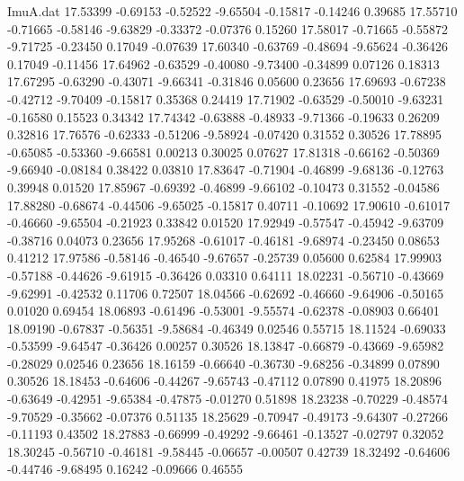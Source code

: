 \begin{filecontents}{ImuA.dat}
  17.53399   -0.69153   -0.52522   -9.65504   -0.15817   -0.14246    0.39685
  17.55710   -0.71665   -0.58146   -9.63829   -0.33372   -0.07376    0.15260
  17.58017   -0.71665   -0.55872   -9.71725   -0.23450    0.17049   -0.07639
  17.60340   -0.63769   -0.48694   -9.65624   -0.36426    0.17049   -0.11456
  17.64962   -0.63529   -0.40080   -9.73400   -0.34899    0.07126    0.18313
  17.67295   -0.63290   -0.43071   -9.66341   -0.31846    0.05600    0.23656
  17.69693   -0.67238   -0.42712   -9.70409   -0.15817    0.35368    0.24419
  17.71902   -0.63529   -0.50010   -9.63231   -0.16580    0.15523    0.34342
  17.74342   -0.63888   -0.48933   -9.71366   -0.19633    0.26209    0.32816
  17.76576   -0.62333   -0.51206   -9.58924   -0.07420    0.31552    0.30526
  17.78895   -0.65085   -0.53360   -9.66581    0.00213    0.30025    0.07627
  17.81318   -0.66162   -0.50369   -9.66940   -0.08184    0.38422    0.03810
  17.83647   -0.71904   -0.46899   -9.68136   -0.12763    0.39948    0.01520
  17.85967   -0.69392   -0.46899   -9.66102   -0.10473    0.31552   -0.04586
  17.88280   -0.68674   -0.44506   -9.65025   -0.15817    0.40711   -0.10692
  17.90610   -0.61017   -0.46660   -9.65504   -0.21923    0.33842    0.01520
  17.92949   -0.57547   -0.45942   -9.63709   -0.38716    0.04073    0.23656
  17.95268   -0.61017   -0.46181   -9.68974   -0.23450    0.08653    0.41212
  17.97586   -0.58146   -0.46540   -9.67657   -0.25739    0.05600    0.62584
  17.99903   -0.57188   -0.44626   -9.61915   -0.36426    0.03310    0.64111
  18.02231   -0.56710   -0.43669   -9.62991   -0.42532    0.11706    0.72507
  18.04566   -0.62692   -0.46660   -9.64906   -0.50165    0.01020    0.69454
  18.06893   -0.61496   -0.53001   -9.55574   -0.62378   -0.08903    0.66401
  18.09190   -0.67837   -0.56351   -9.58684   -0.46349    0.02546    0.55715
  18.11524   -0.69033   -0.53599   -9.64547   -0.36426    0.00257    0.30526
  18.13847   -0.66879   -0.43669   -9.65982   -0.28029    0.02546    0.23656
  18.16159   -0.66640   -0.36730   -9.68256   -0.34899    0.07890    0.30526
  18.18453   -0.64606   -0.44267   -9.65743   -0.47112    0.07890    0.41975
  18.20896   -0.63649   -0.42951   -9.65384   -0.47875   -0.01270    0.51898
  18.23238   -0.70229   -0.48574   -9.70529   -0.35662   -0.07376    0.51135
  18.25629   -0.70947   -0.49173   -9.64307   -0.27266   -0.11193    0.43502
  18.27883   -0.66999   -0.49292   -9.66461   -0.13527   -0.02797    0.32052
  18.30245   -0.56710   -0.46181   -9.58445   -0.06657   -0.00507    0.42739
  18.32492   -0.64606   -0.44746   -9.68495    0.16242   -0.09666    0.46555

\end{filecontents}
